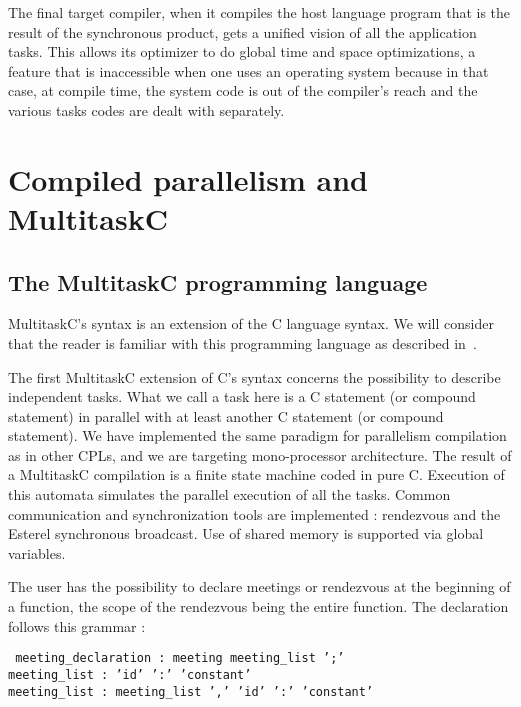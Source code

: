 \documentclass[10pt]{report}
\begin{document}
The final target compiler, when it compiles the host language program that is the result of the synchronous product, gets a unified vision of all
the application tasks. This allows its optimizer to do global time and space optimizations, a feature that is inaccessible when one uses 
an operating system because in that case, at compile time, the system code is out of the compiler's reach and the various tasks codes are dealt with 
separately.

\chapter{Compiled parallelism and MultitaskC}
\label{sec:cp}

\section{The MultitaskC programming language}

MultitaskC's syntax is an extension of the C language syntax. We will consider that the reader is familiar with this programming 
language as described in~\cite{KR:88}.

The first MultitaskC extension of C's syntax concerns the possibility to describe independent tasks. What we call a task here is 
a C statement (or compound statement) in parallel with at least another C statement (or compound statement). We have implemented the same
paradigm for parallelism compilation as in other CPLs, and we are targeting mono-processor architecture. The result of
a MultitaskC compilation is a finite state machine coded in pure C. Execution of this automata simulates the parallel execution of all the tasks. 
Common communication and synchronization tools are implemented : rendezvous and the Esterel synchronous broadcast. Use of shared memory is supported 
via global variables.

The user has the possibility to declare meetings or rendezvous at the beginning of a function, the scope
of the rendezvous being the entire function. The declaration follows this grammar :

\begin{table}[h!]
\tt
\footnotesize
meeting\_declaration : meeting meeting\_list ';'\\
meeting\_list : 'id' ':' 'constant'\\
meeting\_list : meeting\_list ',' 'id' ':' 'constant'\\
\end{table}
\end{document}
